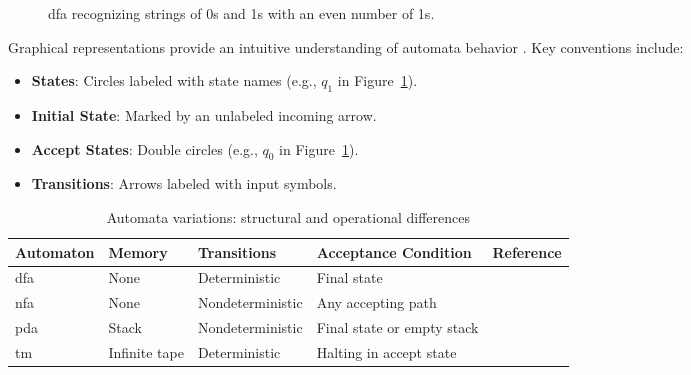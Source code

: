 \begin{figure}[htbp]
    \centering
    \caption{\gls{dfa} recognizing strings of 0s and 1s with an even number of 1s.}
    \label{fig:cfa-example}
\end{figure}

\begin{observation}
Graphical representations provide an intuitive understanding of automata behavior \cite{kozen1997automata, sudkamp2006languages}. 
Key conventions include:
\begin{itemize}
    \item \textbf{States}: Circles labeled with state names (e.g., $q_1$ in Figure~\ref{fig:cfa-example}).
    \item \textbf{Initial State}: Marked by an unlabeled incoming arrow.
    \item \textbf{Accept States}: Double circles (e.g., $q_0$ in Figure~\ref{fig:cfa-example}).
    \item \textbf{Transitions}: Arrows labeled with input symbols.
\end{itemize}
\end{observation}

\begin{table}[htbp]
    \centering
    \begin{adjustbox}{max width=\textwidth}
      \begin{tabular}{@{}lllll@{}}
          \toprule
          \textbf{Automaton} & \textbf{Memory} & \textbf{Transitions} & \textbf{Acceptance Condition} & \textbf{Reference} \\ \midrule
          \gls{dfa} & None & Deterministic & Final state & \cite{sipser2013introduction} \\
          \gls{nfa} & None & Nondeterministic & Any accepting path & \cite{hopcroft2006introduction} \\
          \gls{pda} & Stack & Nondeterministic & Final state or empty stack & \cite{sipser2013introduction} \\
          \gls{tm} & Infinite tape & Deterministic & Halting in accept state & \cite{turing1936computable} \\
          \bottomrule
      \end{tabular}
    \end{adjustbox}
    \caption{Automata variations: structural and operational differences}
    \label{tab:automata-variations}
\end{table}
